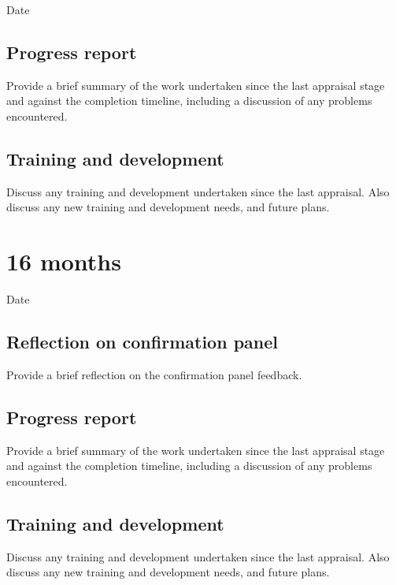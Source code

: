 \documentclass[12pt,a4paper]{article}
\begin{document}
\begin{description}
	\item[Date] %
\end{description}

\subsection{Progress report}
Provide a brief summary of the work undertaken since the last appraisal stage and against the completion timeline, including a discussion of any problems encountered. %

\subsection{Training and development}
Discuss any training and development undertaken since the last appraisal. Also discuss any new training and development needs, and future plans. %


\section{16 months}

\begin{description}
	\item[Date] %
\end{description}

\subsection{Reflection on confirmation panel}
Provide a brief reflection on the confirmation panel feedback. %

\subsection{Progress report}
Provide a brief summary of the work undertaken since the last appraisal stage and against the completion timeline, including a discussion of any problems encountered. %

\subsection{Training and development}
Discuss any training and development undertaken since the last appraisal. Also discuss any new training and development needs, and future plans. %
\end{document}
